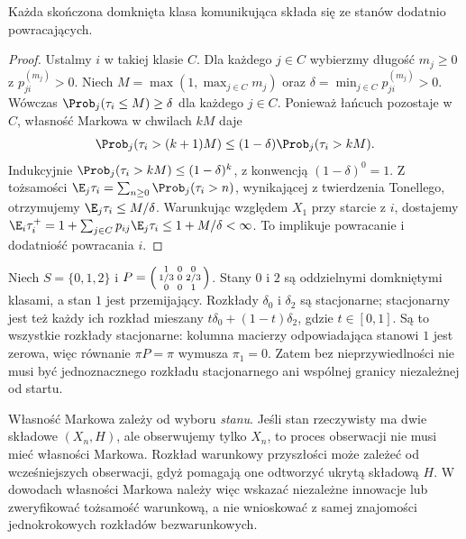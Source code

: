 \begin{wniosek}
Każda skończona domknięta klasa komunikująca
składa się ze stanów dodatnio powracających.
\end{wniosek}
\begin{proof}
Ustalmy $i$ w takiej klasie $C$. Dla każdego $j\in C$
wybierzmy długość $m_j\geq0$ z $p_{ji}^{(m_j)}>0$.
Niech $M=\max(1,\max_{j\in C}m_j)$ oraz
$\delta=\min_{j\in C}p_{ji}^{(m_j)}>0$.
Wówczas $\Prob_j(\tau_i\leq M)\geq\delta$ dla
każdego $j\in C$. Ponieważ łańcuch pozostaje
w $C$, własność Markowa w chwilach $kM$ daje
\[
\Prob_j(\tau_i>(k+1)M)
\leq(1-\delta)\Prob_j(\tau_i>kM).
\]
Indukcyjnie $\Prob_j(\tau_i>kM)\leq(1-\delta)^k$,
z konwencją $(1-\delta)^0=1$.
Z tożsamości $\E_j\tau_i=\sum_{n\geq0}\Prob_j(\tau_i>n)$,
wynikającej z twierdzenia Tonellego, otrzymujemy
$\E_j\tau_i\leq M/\delta$.
Warunkując względem $X_1$ przy starcie z $i$,
dostajemy
$\E_i\tau_i^+=1+\sum_{j\in C}p_{ij}\E_j\tau_i
\leq1+M/\delta<\infty$.
To implikuje powracanie i dodatniość powracania $i$.
\end{proof}

\begin{przyklad}
Niech $S=\{0,1,2\}$ i
$P=\begin{psmallmatrix}1&0&0\\ 1/3&0&2/3\\ 0&0&1\end{psmallmatrix}$.
Stany $0$ i $2$ są oddzielnymi domkniętymi klasami,
a stan $1$ jest przemijający. Rozkłady
$\delta_0$ i $\delta_2$ są stacjonarne;
stacjonarny jest też każdy ich rozkład mieszany
$t\delta_0+(1-t)\delta_2$, gdzie $t\in[0,1]$.
Są to wszystkie rozkłady stacjonarne: kolumna
macierzy odpowiadająca stanowi $1$ jest zerowa,
więc równanie $\pi P=\pi$ wymusza $\pi_1=0$.
Zatem bez nieprzywiedlności nie musi być
jednoznacznego rozkładu stacjonarnego ani
wspólnej granicy niezależnej od startu.
\end{przyklad}

\begin{uwaga}
Własność Markowa zależy od wyboru \emph{stanu}.
Jeśli stan rzeczywisty ma dwie składowe $(X_n,H)$,
ale obserwujemy tylko $X_n$, to proces obserwacji
nie musi mieć własności Markowa. Rozkład warunkowy
przyszłości może zależeć od wcześniejszych obserwacji,
gdyż pomagają one odtworzyć ukrytą składową $H$.
W dowodach własności Markowa należy więc wskazać
niezależne innowacje lub zweryfikować tożsamość
warunkową, a nie wnioskować z samej znajomości
jednokrokowych rozkładów bezwarunkowych.
\end{uwaga}

